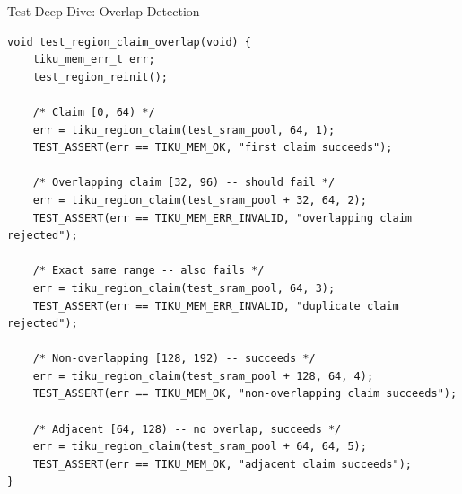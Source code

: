 \documentclass[aspectratio=169, 10pt]{beamer}
\begin{document}
\begin{frame}[fragile]{Test Deep Dive: Overlap Detection}
\begin{lstlisting}[style=cstyle, title={test\_mem\_region.c --- Claim overlap detection}]
void test_region_claim_overlap(void) {
    tiku_mem_err_t err;
    test_region_reinit();

    /* Claim [0, 64) */
    err = tiku_region_claim(test_sram_pool, 64, 1);
    TEST_ASSERT(err == TIKU_MEM_OK, "first claim succeeds");

    /* Overlapping claim [32, 96) -- should fail */
    err = tiku_region_claim(test_sram_pool + 32, 64, 2);
    TEST_ASSERT(err == TIKU_MEM_ERR_INVALID, "overlapping claim rejected");

    /* Exact same range -- also fails */
    err = tiku_region_claim(test_sram_pool, 64, 3);
    TEST_ASSERT(err == TIKU_MEM_ERR_INVALID, "duplicate claim rejected");

    /* Non-overlapping [128, 192) -- succeeds */
    err = tiku_region_claim(test_sram_pool + 128, 64, 4);
    TEST_ASSERT(err == TIKU_MEM_OK, "non-overlapping claim succeeds");

    /* Adjacent [64, 128) -- no overlap, succeeds */
    err = tiku_region_claim(test_sram_pool + 64, 64, 5);
    TEST_ASSERT(err == TIKU_MEM_OK, "adjacent claim succeeds");
}
\end{lstlisting}
\end{frame}
\end{document}
